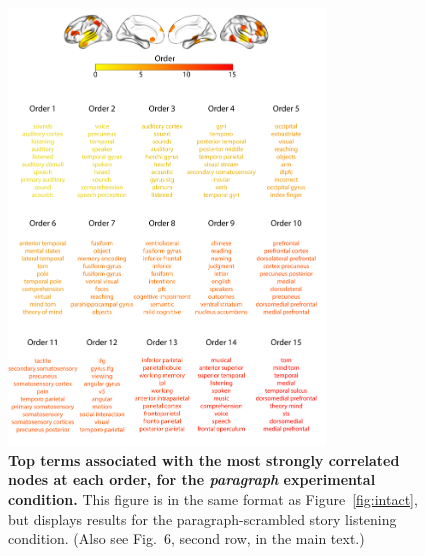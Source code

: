 \documentclass{article}
\newcommand{\neurosynth}{6}
\begin{document}
\begin{figure}[p!]
\centering
\includegraphics[width=0.75\textwidth]{figs/supp_15_paragraph}
\caption{\textbf{Top terms associated with the most strongly
      correlated nodes at each order, for the \textit{paragraph} experimental
    condition.}  This figure is in the same format as
  Figure~\ref{fig:intact}, but displays results for the
  paragraph-scrambled story listening condition.  (Also see Fig.~\neurosynth,
second row, in the main text.)}
\label{fig:paragraph}
\end{figure}
\end{document}
